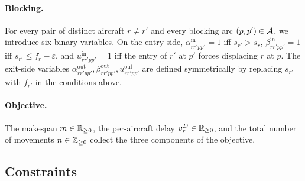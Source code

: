 \paragraph{Blocking.}
For every pair of distinct aircraft $r \ne r'$ and every blocking arc
$(p, p') \in \mathcal{A}$, we introduce six binary variables.  On the entry
side, $\alpha^{\mathrm{in}}_{rr'pp'} = 1$ iff $s_{r'} > s_r$,
$\beta^{\mathrm{in}}_{rr'pp'} = 1$ iff $s_{r'} \le f_r - \varepsilon$, and
$u^{\mathrm{in}}_{rr'pp'} = 1$ iff the entry of $r'$ at $p'$ forces
displacing $r$ at $p$.  The exit-side variables
$\alpha^{\mathrm{out}}_{rr'pp'}, \beta^{\mathrm{out}}_{rr'pp'},
u^{\mathrm{out}}_{rr'pp'}$ are defined symmetrically by replacing $s_{r'}$
with $f_{r'}$ in the conditions above.

\paragraph{Objective.}
The makespan $m \in \mathbb{R}_{\geq 0}$, the per-aircraft delay $v^D_r \in \mathbb{R}_{\geq 0}$, and the
total number of movements $n \in \mathbb{Z}_{\geq 0}$ collect the three components of the
objective.

\subsection*{Constraints}

